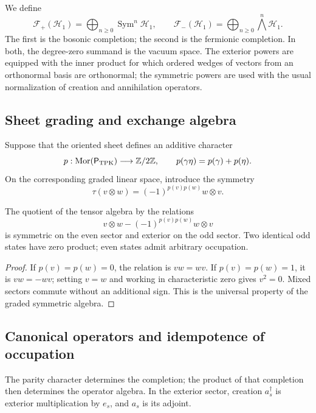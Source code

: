 We define
\[
 \mathcal F_+(\mathcal H_1)=
 \bigoplus_{n\geq0}\operatorname{Sym}^n\mathcal H_1,
 \qquad
 \mathcal F_-(\mathcal H_1)=
 \bigoplus_{n\geq0}\bigwedge^n\mathcal H_1.
\]
The first is the bosonic completion; the second is the fermionic completion. In both,
the degree-zero summand is the vacuum space. The exterior powers
are equipped with the inner product for which ordered wedges of vectors
from an orthonormal basis are orthonormal; the symmetric powers are used
with the usual normalization of creation and annihilation operators.

\subsection{Sheet grading and exchange algebra}
\label{v:v:rec:completaciones:section:04}

Suppose that the oriented sheet defines an additive character
\[
 p:\operatorname{Mor}(\mathsf P_{\rm TPK})\longrightarrow\mathbb Z/2\mathbb Z,
 \qquad p(\gamma\eta)=p(\gamma)+p(\eta).
\]
On the corresponding graded linear space, introduce the symmetry
\[
 \tau(v\otimes w)=(-1)^{p(v)p(w)}w\otimes v.
\]

\begin{theorem}
\label{v:v:rec:completaciones:statement:02}
The quotient of the tensor algebra by the relations
\[
 v\otimes w-(-1)^{p(v)p(w)}w\otimes v
\]
is symmetric on the even sector and exterior on the odd sector. Two identical
odd states have zero product; even states admit arbitrary
occupation.
\end{theorem}

\begin{proof}
If \(p(v)=p(w)=0\), the relation is \(vw=wv\). If
\(p(v)=p(w)=1\), it is \(vw=-wv\); setting \(v=w\) and working in
characteristic zero gives \(v^2=0\). Mixed sectors commute without
an additional sign. This is the universal property of the graded symmetric
algebra.
\end{proof}

\subsection{Canonical operators and idempotence of occupation}
\label{v:v:pauli:car-construccion}

The parity character determines the completion; the product of that
completion then determines the operator algebra. In the
exterior sector, creation \(a_s^\dagger\) is exterior multiplication by
\(e_s\), and \(a_s\) is its adjoint.

